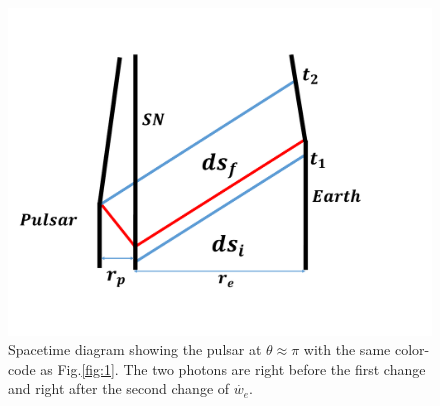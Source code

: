 \documentclass[aps,showpacs,onecolumn,floats,prd,superscriptaddress,nofootinbib]{revtex4}
\begin{document}
\begin{figure}[tb]
\begin{center}
\includegraphics[scale = 0.3]{Image5.pdf}
\caption{Spacetime diagram showing the pulsar at $\theta \approx \pi$ with the same color-code as Fig.\ref{fig:1}. The two photons are right before the first change and right after the second change of $\dot{w_e}$.}
\label{fig-opposite}
\end{center}
\end{figure}
\end{document}
